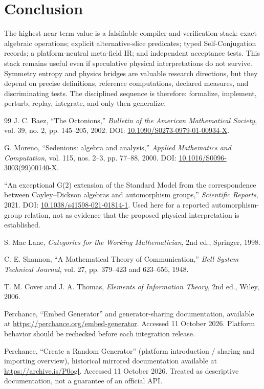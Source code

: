 \documentclass[11pt,oneside]{article}
\begin{document}
\section{Conclusion}
The highest near-term value is a falsifiable compiler-and-verification stack: exact algebraic operations; explicit alternative-slice predicates; typed Self-Conjugation records; a platform-neutral meta-field IR; and independent acceptance tests. This stack remains useful even if speculative physical interpretations do not survive. Symmetry entropy and physics bridges are valuable research directions, but they depend on precise definitions, reference computations, declared measures, and discriminating tests. The disciplined sequence is therefore: formalize, implement, perturb, replay, integrate, and only then generalize.

\begin{thebibliography}{99}
J. C. Baez, ``The Octonions,'' \emph{Bulletin of the American Mathematical Society}, vol. 39, no. 2, pp. 145--205, 2002. DOI: \href{https://doi.org/10.1090/S0273-0979-01-00934-X}{10.1090/S0273-0979-01-00934-X}.

G. Moreno, ``Sedenions: algebra and analysis,'' \emph{Applied Mathematics and Computation}, vol. 115, nos. 2--3, pp. 77--88, 2000. DOI: \href{https://doi.org/10.1016/S0096-3003(99)00140-X}{10.1016/S0096-3003(99)00140-X}.

``An exceptional G(2) extension of the Standard Model from the correspondence between Cayley--Dickson algebras and automorphism groups,'' \emph{Scientific Reports}, 2021. DOI: \href{https://doi.org/10.1038/s41598-021-01814-1}{10.1038/s41598-021-01814-1}. Used here for a reported automorphism-group relation, not as evidence that the proposed physical interpretation is established.

S. Mac Lane, \emph{Categories for the Working Mathematician}, 2nd ed., Springer, 1998.

C. E. Shannon, ``A Mathematical Theory of Communication,'' \emph{Bell System Technical Journal}, vol. 27, pp. 379--423 and 623--656, 1948.

T. M. Cover and J. A. Thomas, \emph{Elements of Information Theory}, 2nd ed., Wiley, 2006.

Perchance, ``Embed Generator'' and generator-sharing documentation, available at \url{https://perchance.org/embed-generator}. Accessed 11 October 2026. Platform behavior should be rechecked before each integration release.

Perchance, ``Create a Random Generator'' (platform introduction / sharing and importing overview), historical mirrored documentation available at \url{https://archive.is/P0ogl}. Accessed 11 October 2026. Treated as descriptive documentation, not a guarantee of an official API.
\end{thebibliography}
\end{document}
